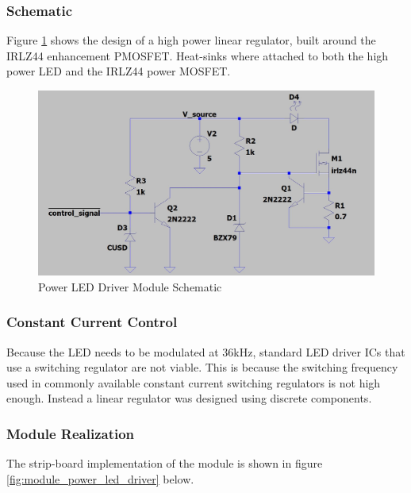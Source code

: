 \subsubsection{Schematic}
Figure \ref{fig:schematic_power_led_driver} shows the design of a high power linear regulator, built around the IRLZ44 enhancement PMOSFET. Heat-sinks where attached to both the high power LED and the IRLZ44 power MOSFET.

\begin{figure}[H]
	\centering
	\includegraphics[width=.8\textwidth]{figures/design/power_led_driver.JPG}
	\caption{Power LED Driver Module Schematic}
	\label{fig:schematic_power_led_driver}
\end{figure}

\subsubsection{Constant Current Control}

Because the LED needs to be modulated at 36kHz, standard LED driver ICs that use a switching regulator are not viable. This is because the switching frequency used in commonly available constant current switching regulators is not high enough. Instead a linear regulator was designed using discrete components.



\subsubsection{Module Realization}
The strip-board implementation of the module is shown in figure \ref{fig:module_power_led_driver} below.

